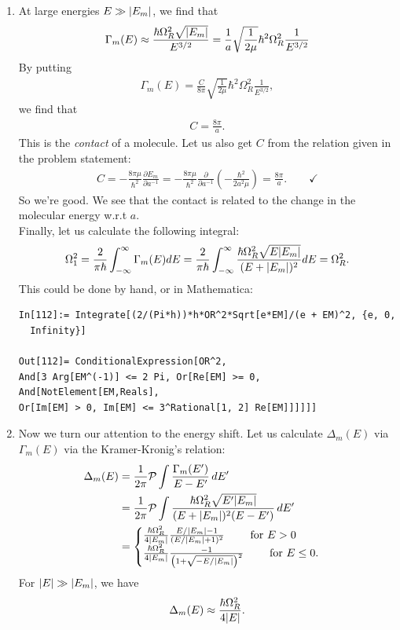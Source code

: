 \documentclass{article}
\theoremstyle{definition}
\newcommand{\p}{\partial}
\newcommand{\f}[2]{\frac{#1}{#2}}
\newcommand{\lp}{\left(}
\newcommand{\rp}{\right)}
\begin{document}
\begin{enumerate}[label=(\alph*)]
\item At large energies $E \gg \abs{E_m}$, we find that
\begin{align*}
\Gamma_m(E) \approx \f{\hbar \Omega_R^2\sqrt{\abs{E_m}}}{E^{3/2}} = \f{1}{a} \sqrt{\f{1}{2\mu}} \hbar^2 \Omega_R^2 \f{1}{E^{3/2}}
\end{align*}
By putting  
\begin{align*}
\Gamma_m(E) = \f{C}{8\pi} \sqrt{\f{1}{2\mu}} \hbar^2 \Omega_R^2 \f{1}{E^{3/2}},
\end{align*}
we find that
\begin{align*}
C = \f{8\pi }{a}.
\end{align*}
This is the \textit{contact} of a molecule. Let us also get $C$ from the relation given in the problem statement:
\begin{align*}
C = -\f{8\pi \mu}{\hbar^2} \f{\p E_m}{\p a^{-1}} = -\f{8\pi \mu}{\hbar^2} \f{\p}{\p a^{-1}} \lp -\f{\hbar^2}{2a^2 \mu} \rp = \f{8\pi}{a}. \quad\quad \checkmark
\end{align*}
So we're good. We see that the contact is related to the change in the molecular energy w.r.t $a$. \\

Finally, let us calculate the following integral:
\begin{align*}
\Omega_1^2 = \f{2}{\pi \hbar} \int_{-\infty}^\infty \Gamma_m(E) dE =  \f{2}{\pi \hbar} \int_{-\infty}^\infty \f{\hbar \Omega_R^2 \sqrt{E \abs{E_m}}}{(E + \abs{E_m})^2} dE = \Omega_R^2. 
\end{align*}
This could be done by hand, or in Mathematica:
\begin{lstlisting}
In[112]:= Integrate[(2/(Pi*h))*h*OR^2*Sqrt[e*EM]/(e + EM)^2, {e, 0, 
  Infinity}]

Out[112]= ConditionalExpression[OR^2, 
And[3 Arg[EM^(-1)] <= 2 Pi, Or[Re[EM] >= 0, And[NotElement[EM,Reals], 
Or[Im[EM] > 0, Im[EM] <= 3^Rational[1, 2] Re[EM]]]]]]
\end{lstlisting}

\item Now we turn our attention to the energy shift. Let us calculate $\Delta_m(E)$ via $\Gamma_m(E)$ via the Kramer-Kronig's relation:
\begin{align*}
\Delta_m(E) 
&= \f{1}{2\pi}\mathcal{P} \int \f{\Gamma_m(E')}{ E - E'} \,dE' \\
&= \f{1}{2\pi}\mathcal{P} \int \f{\hbar \Omega_R^2 \sqrt{E' \abs{E_m}}}{ (E + \abs{E_m})^2(E - E')} \,dE' \\
&= 
\begin{cases}
\f{\hbar \Omega_R^2}{4 \abs{E_m}} \f{E/\abs{E_m} - 1}{(E/\abs{E_m} + 1 )^2} \quad\quad \text{ for } E > 0 \\ 
\f{\hbar \Omega_R^2}{4 \abs{E_m}} \f{ -1 }{\lp 1 + \sqrt{-E/\abs{E_m}} \rp^2} \quad\quad \text{ for } E \leq  0. 
\end{cases}
\end{align*}
For $\abs{E} \gg \abs{E_m}$, we have
\begin{align*}
\Delta_m(E) \approx \f{\hbar \Omega_R^2}{4\abs{E}}.
\end{align*}


\end{enumerate}
\end{document}
